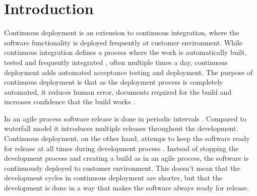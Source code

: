 \documentclass[conference]{IEEEtran}
\begin{document}
%


\IEEEpeerreviewmaketitle




%



\section{Introduction} %

Continuous deployment is an extension to continuous integration, where the software functionality is deployed frequently at customer environment. While continuous integration defines a process where the work is automatically built, tested and frequently integrated \cite{fowler2006continuous}, often multiple times a day, continuous deployment adds automated acceptance testing and deployment. The purpose of continuous deployment is that as the deployment process is completely automated, it reduces human error, documents required for the build and increases confidence that the build works \cite{cdbook}. 

In an agile process software release is done in periodic intervals \cite{cockburn2002agile}. Compared to waterfall model it introduces multiple releases throughout the development. Continuous deployment, on the other hand, attemps to keep the software ready for release at all times during development process \cite{cdbook}. Instead of stopping the development process and creating a build as in an agile process, the software is continuously deployed to customer environment. This doesn't mean that the development cycles in continuous deployment are shorter, but that the development is done in a way that makes the software always ready for release.
\end{document}

